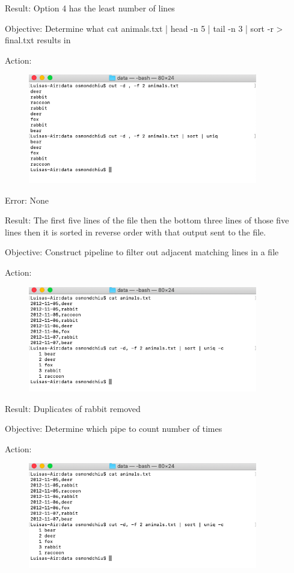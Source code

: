 \documentclass{article}
\begin{document}
Result: Option 4 has the least number of lines

Objective: Determine what cat animals.txt | head -n 5 | tail -n 3 | sort -r > final.txt results in\par
Action:\par
\begin{figure}[htp]
    \centering
    \includegraphics[width=10cm]{Screenshot11.png}
    \label{fig:ls-11}
\end{figure}
Error: None \par

Result: The first five lines of the file then the bottom three lines of those five lines then it is sorted in reverse order with that output sent to the file.\par

Objective: Construct pipeline to filter out adjacent matching lines in a file

Action:\par
\begin{figure}[htp]
    \centering
    \includegraphics[width=10cm]{Screenshot12.png}
    \label{fig:ls-12}
\end{figure}

Result: Duplicates of rabbit removed

Objective: Determine which pipe to count number of times

Action:\par
\begin{figure}[htp]
    \centering
    \includegraphics[width=10cm]{Screenshot13.png}
    \label{fig:ls-13}
\end{figure}
\end{document}
